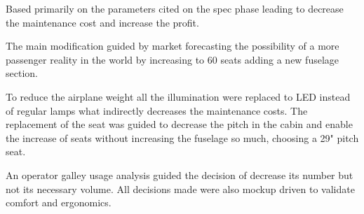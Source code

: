 Based primarily on the parameters cited on the spec phase leading to decrease the maintenance cost and increase the profit.


The main modification guided by market forecasting the possibility of a more passenger reality in the world by increasing to 60 seats adding a new fuselage section.


To reduce the airplane weight all the illumination were replaced to LED instead of regular lamps what indirectly decreases the maintenance costs. The replacement of the seat was guided to decrease the pitch in the cabin and enable the increase of seats without increasing the fuselage so much, choosing a 29" pitch seat.


An operator galley usage analysis guided the decision of decrease its number but not its necessary volume.
All decisions made were also mockup driven to validate comfort and ergonomics.
